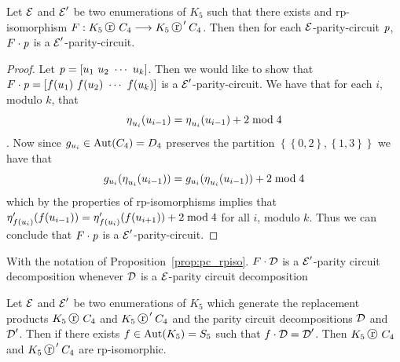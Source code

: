 \begin{proposition}
  \label{prop:pc_rpiso}
Let $\operatorname{\mathcal{E}}$ and $\operatorname{\mathcal{E}}^{\prime}$ be two enumerations of $K_5$ such that there exists and rp-isomorphism $F:K_5 \replacement C_4 \longrightarrow K_5 \replacement^{\prime} C_4$. Then then for each $\operatorname{\mathcal{E}}$-{parity-circuit} $\operatorname{\mathit{p}}$, $F \cdot \operatorname{\mathit{p}}$ is a $\operatorname{\mathcal{E}}^{\prime}$-{parity-circuit}.
\end{proposition}


\begin{proof}

Let $\ppath = \left[ u_1\ u_2\ \cdots\ u_k\right]$. Then we would like to show that $\acts{F}{\ppath} = \left[ f(u_1)\ f(u_2)\ \cdots\ f(u_k)\right]$ is a $\operatorname{\mathcal{E}}^{\prime}$-{parity-circuit}. We have that for each $i$, modulo $k$, that \[ \operatorname{\eta}_{u_i}(u_{i-1}) = \operatorname{\eta}_{u_i}(u_{i-1}) + 2 \bmod{4}     \]. Now since $g_{u_i} \in \operatorname{\mathrm{Aut}}(C_4) = D_4$ preserves the partition $\left\{ \left\{0,2 \right\}  , \left\{1,3  \right\}  \right\}$ we have that \[    g_{u_i}(\operatorname{\eta}_{u_i}(u_{i-1})) = g_{u_i}(\operatorname{\eta}_{u_i}(u_{i-1})) + 2 \bmod{4}             \] which by the properties of rp-isomorphisms implies that $\operatorname{\eta}^{\prime}_{f(u_{i})}(f(u_{i-1})) = \operatorname{\eta}^{\prime}_{f(u_i)}(f(u_{i+1})) + 2 \bmod{4}$ for all $i$, modulo $k$. Thus we can conclude that $F \cdot \operatorname{\mathit{p}}$ is a $\operatorname{\mathcal{E}}^{\prime}$-{parity-circuit}.  
\end{proof}

\begin{corollary}
\label{cor:pcd_rpiso}
With the notation of Proposition~\ref{prop:pc_rpiso}. $F \cdot \operatorname{\mathcal{D}}$ is a $\operatorname{\mathcal{E}}^{\prime}$-{parity circuit decomposition} whenever $\operatorname{\mathcal{D}}$ is a $\operatorname{\mathcal{E}}$-{parity circuit decomposition} 
\end{corollary}

\begin{proposition}
\label{prop:repl-iso-pcd-action}
Let $\operatorname{\mathcal{E}}$ and $\operatorname{\mathcal{E}}^{\prime}$ be two enumerations of $K_5$ which generate the replacement products $K_5 \replacement C_4$ and $K_5 \replacement^{\prime} C_4$ and the parity circuit decompositions $\operatorname{\mathcal{D}}$ and $\operatorname{\mathcal{D}}^{\prime}$. Then if there exists $f \in \operatorname{\mathrm{Aut}}(K_5) = S_5$ such that $f \cdot \operatorname{\mathcal{D}} = \operatorname{\mathcal{D}}^{\prime}$. Then $K_5 \replacement C_4$ and $K_5 \replacement^{\prime} C_4$ are rp-isomorphic.
\end{proposition}

